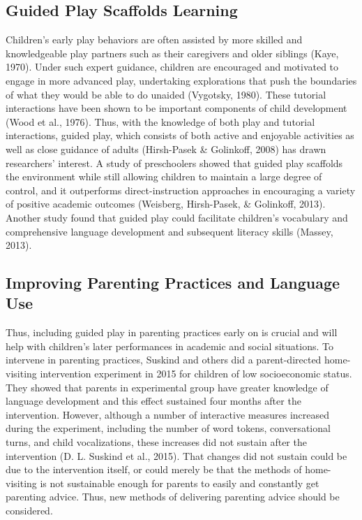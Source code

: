 \documentclass[10pt, letterpaper]{article}
\begin{document}
\subsection{Guided Play Scaffolds
Learning}\label{guided-play-scaffolds-learning}

Children's early play behaviors are often assisted by more skilled and
knowledgeable play partners such as their caregivers and older siblings
(Kaye, 1970). Under such expert guidance, children are encouraged and
motivated to engage in more advanced play, undertaking explorations that
push the boundaries of what they would be able to do unaided (Vygotsky,
1980). These tutorial interactions have been shown to be important
components of child development (Wood et al., 1976). Thus, with the
knowledge of both play and tutorial interactions, guided play, which
consists of both active and enjoyable activities as well as close
guidance of adults (Hirsh-Pasek \& Golinkoff, 2008) has drawn
researchers' interest. A study of preschoolers showed that guided play
scaffolds the environment while still allowing children to maintain a
large degree of control, and it outperforms direct-instruction
approaches in encouraging a variety of positive academic outcomes
(Weisberg, Hirsh-Pasek, \& Golinkoff, 2013). Another study found that
guided play could facilitate children's vocabulary and comprehensive
language development and subsequent literacy skills (Massey, 2013).

\subsection{Improving Parenting Practices and Language
Use}\label{improving-parenting-practices-and-language-use}

Thus, including guided play in parenting practices early on is crucial
and will help with children's later performances in academic and social
situations. To intervene in parenting practices, Suskind and others did
a parent-directed home-visiting intervention experiment in 2015 for
children of low socioeconomic status. They showed that parents in
experimental group have greater knowledge of language development and
this effect sustained four months after the intervention. However,
although a number of interactive measures increased during the
experiment, including the number of word tokens, conversational turns,
and child vocalizations, these increases did not sustain after the
intervention (D. L. Suskind et al., 2015). That changes did not sustain
could be due to the intervention itself, or could merely be that the
methods of home-visiting is not sustainable enough for parents to easily
and constantly get parenting advice. Thus, new methods of delivering
parenting advice should be considered.
\end{document}
